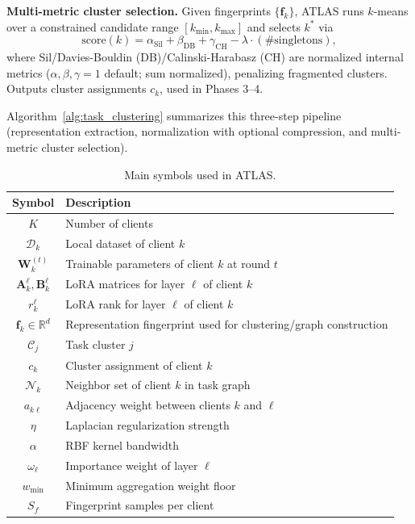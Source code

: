 \documentclass[conference]{IEEEtran}
\begin{document}
\textbf{Multi-metric cluster selection.} Given fingerprints $\{\mathbf{f}_k\}$, ATLAS runs $k$-means over a constrained candidate range $[k_\text{min}, k_\text{max}]$ and selects $k^*$ via
$$
\text{score}(k) = \alpha_\text{Sil} + \beta_\text{DB} + \gamma_\text{CH} - \lambda \cdot (\# \text{singletons}),
$$
where Sil/Davies-Bouldin (DB)/Calinski-Harabasz (CH) are normalized internal metrics ($\alpha,\beta,\gamma=1$ default; sum normalized), penalizing fragmented clusters. Outputs cluster assignments $c_k$, used in Phases 3--4.


Algorithm~\ref{alg:task_clustering} summarizes this three-step pipeline (representation extraction, normalization with optional compression, and multi-metric cluster selection).

\begin{table}[t]
\centering
\caption{Main symbols used in ATLAS.}
\begin{tabular}{cl}
\hline
\textbf{Symbol} & \textbf{Description} \\
\hline
$K$ & Number of clients \\
$\mathcal{D}_k$ & Local dataset of client $k$ \\
$\mathbf{W}_k^{(t)}$ & Trainable parameters of client $k$ at round $t$ \\
$\mathbf{A}_k^\ell, \mathbf{B}_k^\ell$ & LoRA matrices for layer $\ell$ of client $k$ \\
$r_k^\ell$ & LoRA rank for layer $\ell$ of client $k$ \\
$\mathbf{f}_k \in \mathbb{R}^d$ & Representation fingerprint used for clustering/graph construction \\
$\mathcal{C}_j$ & Task cluster $j$ \\
$c_k$ & Cluster assignment of client $k$ \\
$\mathcal{N}_k$ & Neighbor set of client $k$ in task graph \\
$a_{k\ell}$ & Adjacency weight between clients $k$ and $\ell$ \\
$\eta$ & Laplacian regularization strength \\
$\alpha$ & RBF kernel bandwidth \\
$\omega_\ell$ & Importance weight of layer $\ell$ \\
$w_{\min}$ & Minimum aggregation weight floor \\
$S_f$ & Fingerprint samples per client \\
\hline
\end{tabular}
\end{table}
\end{document}
